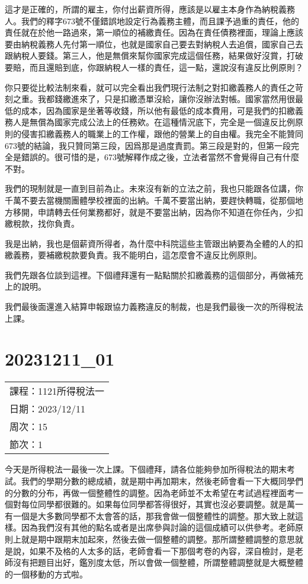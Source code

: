 \documentclass[]{ctexbook}
\begin{document}
這才是正確的，所謂的雇主，你付出薪資所得，應該是以雇主本身作為納稅義務人。我們的釋字673號不僅錯誤地設定行為義務主體，而且課予過重的責任，他的責任就在於他一路過來，第一順位的補繳責任。因為在責任債務裡面，理論上應該要由納稅義務人先付第一順位，也就是國家自己要去對納稅人去追償，國家自己去跟納稅人要錢。第三人，他是無償來幫你國家完成這個任務，結果做好沒賞，打破要賠，而且還賠到底，你跟納稅人一樣的責任，這一點，還說沒有違反比例原則？

你只要從比較法制來看，就可以完全看出我們現行法制之對扣繳義務人的責任之苛刻之重。我都錢繳進來了，只是扣繳憑單沒給，讓你沒辦法對帳。國家當然用很最低的成本，因為國家是坐著等收錢，所以他有最低的成本費用，可是我們的扣繳義務人是無償為國家完成公法上的任務欸。在這種情況底下，完全是一個違反比例原則的侵害扣繳義務人的職業上的工作權，跟他的營業上的自由權。我完全不能贊同673號的結論，我只贊同第三段，因爲那是過度責罰。第三段是對的，但第一段完全是錯誤的。很可惜的是，673號解釋作成之後，立法者當然不會覺得自己有什麼不對。

我們的現制就是一直到目前為止。未來沒有新的立法之前，我也只能跟各位講，你千萬不要去當機關團體學校裡面的出納。千萬不要當出納，要趕快轉職，從那個地方移開，申請轉去任何業務都好，就是不要當出納，因為你不知道在你任內，少扣繳稅款，找你負責。

我是出納，我也是個薪資所得者，為什麼中科院這些主管跟出納要為全體的人的扣繳義務，要補繳稅款要負責。我不能明白，這怎麼會不違反比例原則。

我們先跟各位談到這裡。下個禮拜還有一點點關於扣繳義務的這個部分，再做補充上的說明。

我們最後面還進入結算申報跟協力義務違反的制裁，也是我們最後一次的所得稅法上課。

\hypertarget{section-27}{%
\chapter{20231211\_01}\label{section-27}}

\begin{longtable}[]{@{}l@{}}
\toprule()
\endhead
課程：1121所得稅法一 \\
日期：2023/12/11 \\
周次：15 \\
節次：1 \\
\bottomrule()
\end{longtable}

今天是所得稅法一最後一次上課。下個禮拜，請各位能夠參加所得稅法的期末考試。我們的學期分數的總成績，就是期中再加期末，然後老師會看一下大概同學們的分數的分布，再做一個整體性的調整。因為老師並不太希望在考試過程裡面考一個對每位同學都很難的。如果每位同學都答得很好，其實也沒必要調整。就是萬一有一個是大多數同學都不太會答的話，那我會做一個整體性的調整。那大致上就這樣。因為我們沒有其他的點名或者是出席參與討論的這個成績可以供參考。老師原則上就是期中跟期末加起來，然後去做一個整體的調整。那所謂整體調整的意思就是說，如果不及格的人太多的話，老師會看一下那個考卷的內容，深自檢討，是老師沒有把題目出好，鑑別度太低，所以會做一個整體，所謂整體調整就是大概整體的一個移動的方式啦。
\end{document}
